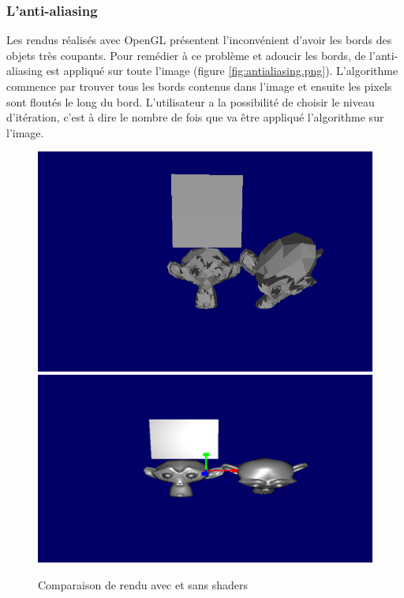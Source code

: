 \subsubsection{L'anti-aliasing}
Les rendus réalisés avec OpenGL présentent l'inconvénient d'avoir les bords des objets très coupants. Pour remédier à ce problème et adoucir les bords, de l'anti-aliasing est appliqué sur toute l'image (figure \ref{fig:antialiasing.png}). L'algorithme commence par trouver tous les bords contenus dans l'image et ensuite les pixels sont floutés le long du bord.
L'utilisateur a la possibilité de choisir le niveau d'itération, c'est à dire le nombre de fois que va être appliqué l'algorithme sur l'image.

\begin{figure}[h!]
	\centering
	\includegraphics[scale=0.47]{images/rendu_sans_shader.png}
        \includegraphics[scale=0.3]{images/singe_shaders.png}
	\caption{\label{fig:screenRenduSansShader.png} Comparaison de rendu avec et sans shaders \protect}
\end{figure}
